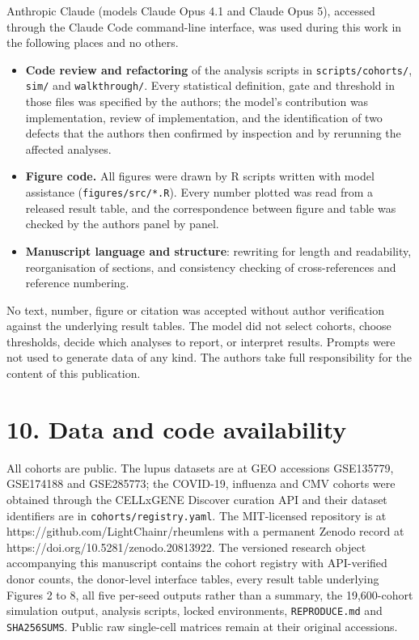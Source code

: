 Anthropic Claude (models Claude Opus 4.1 and Claude Opus 5), accessed through the Claude Code command-line interface, was used during this work in the following places and no others.

\begin{itemize}
\tightlist
\item
  \textbf{Code review and refactoring} of the analysis scripts in \texttt{scripts/cohorts/}, \texttt{sim/} and \texttt{walkthrough/}. Every statistical definition, gate and threshold in those files was specified by the authors; the model's contribution was implementation, review of implementation, and the identification of two defects that the authors then confirmed by inspection and by rerunning the affected analyses.
\item
  \textbf{Figure code.} All figures were drawn by R scripts written with model assistance (\texttt{figures/src/*.R}). Every number plotted was read from a released result table, and the correspondence between figure and table was checked by the authors panel by panel.
\item
  \textbf{Manuscript language and structure}: rewriting for length and readability, reorganisation of sections, and consistency checking of cross-references and reference numbering.
\end{itemize}

No text, number, figure or citation was accepted without author verification against the underlying result tables. The model did not select cohorts, choose thresholds, decide which analyses to report, or interpret results. Prompts were not used to generate data of any kind. The authors take full responsibility for the content of this publication.

\section{10. Data and code availability}\label{data-and-code-availability}

All cohorts are public. The lupus datasets are at GEO accessions GSE135779, GSE174188 and GSE285773; the COVID-19, influenza and CMV cohorts were obtained through the CELLxGENE Discover curation API and their dataset identifiers are in \texttt{cohorts/registry.yaml}. The MIT-licensed repository is at https://github.com/LightChainr/rheumlens with a permanent Zenodo record at https://doi.org/10.5281/zenodo.20813922. The versioned research object accompanying this manuscript contains the cohort registry with API-verified donor counts, the donor-level interface tables, every result table underlying Figures 2 to 8, all five per-seed outputs rather than a summary, the 19,600-cohort simulation output, analysis scripts, locked environments, \texttt{REPRODUCE.md} and \texttt{SHA256SUMS}. Public raw single-cell matrices remain at their original accessions.

